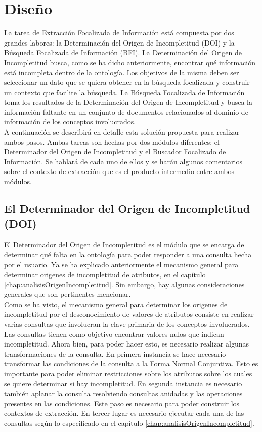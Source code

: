 \chapter{Diseño} \label{chap:diseno}

La tarea de Extracción Focalizada de Información está compuesta por dos grandes labores: la Determinación del Origen de Incompletitud (DOI) y la Búsqueda Focalizada de Información (BFI). La Determinación del Origen de Incompletitud busca, como se ha dicho anteriormente, encontrar qué información está incompleta dentro de la ontología. Los objetivos de la misma deben ser seleccionar un dato que se quiera obtener en la búsqueda focalizada y construir un contexto que facilite la búsqueda.  La Búsqueda Focalizada de Información toma los resultados de la Determinación del Origen de Incompletitud y busca la información faltante en un conjunto de documentos relacionados al dominio de información de los conceptos involucrados. \\

A continuación se describirá en detalle esta solución propuesta para realizar ambos pasos. Ambas tareas son hechas por dos módulos diferentes: el Determinador del Origen de Incompletitud y el Buscador Focalizado de Información. Se hablará de cada uno de ellos y se harán algunos comentarios sobre el contexto de extracción que es el producto intermedio entre ambos módulos. \\

\section{El Determinador del Origen de Incompletitud (DOI)}\label{sect:diseno-DOI}

El Determinador del Origen de Incompletitud es el módulo que se encarga de determinar qué falta en la ontología para poder responder a una consulta hecha por el usuario. Ya se ha explicado anteriormente el mecanismo general para determinar origenes de incompletitud de atributos, en el capítulo \ref{chap:analisisOrigenIncompletitud}. Sin embargo, hay algunas consideraciones generales que son pertinentes mencionar. \\

Como se ha visto, el mecanismo general para determinar los origenes de incompletitud por el desconocimiento de valores de atributos consiste en realizar varias consultas que involucran la clave primaria de los conceptos involucrados. Las consultas tienen como objetivo encontrar valores nulos que indican incompletitud. Ahora bien, para poder hacer esto, es necesario realizar algunas transformaciones de la consulta. En primera instancia se hace necesario transformar las condiciones de la consulta a la Forma Normal Conjuntiva. Esto es importante para poder eliminar restricciones sobre los atributos sobre los cuales se quiere determinar si hay incompletitud. En segunda instancia es necesario también aplanar la consulta resolviendo consultas anidadas y las operaciones presentes en las condiciones. Este paso es necesario para poder construir los contextos de extracción. En tercer lugar es necesario ejecutar cada una de las consultas según lo especificado en el capítulo \ref{chap:analisisOrigenIncompletitud}. \\

